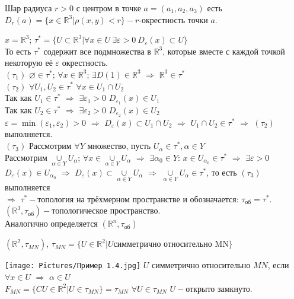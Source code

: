 \documentclass[11pt,fleqn]{book} %
\begin{document}
\begin{definition}[Шар]
Шар радиуса $r>0$ с центром в точке $a=(a_1,a_2,a_3)$ есть $D_r(a)=\{x{\in}\mathbb{R}^3|\rho(x,y)<r\}-r$-окрестность точки $a$.
\end{definition}

\begin{example}
$x=\mathbb{R}^3$; $\tau^*=\{U{\subset}\mathbb{R}^3|\forall x{\in}U \ \exists \varepsilon>0 \ D_{\varepsilon}(x){\subset}U\}$\\
То есть $\tau^*$ содержит все подмножества в $\mathbb{R}^3$, которые вместе с каждой точкой некоторую её $\varepsilon$ окрестность.\\
$(\tau_1)$ $\varnothing{\in}\tau^*$; $\forall x{\in}\mathbb{R}^3$; $\exists D(1){\in}\mathbb{R}^3$ $\Rightarrow$ $\mathbb{R}^3{\in}\tau^*$\\
$(\tau_2)$ $\forall U_1,U_2{\in}\tau^*$ $\forall x{\in}U_1{\cap}U_2$\\
Так как $U_1{\in}\tau^*$ $\Rightarrow$ $\exists \varepsilon_1>0$ $D_{\varepsilon_1}(x){\in}U_1$\\
Так как $U_2{\in}\tau^*$ $\Rightarrow$ $\exists \varepsilon_2>0$ $D_{\varepsilon_2}(x){\in}U_2$\\
$\varepsilon=\min(\varepsilon_1,\varepsilon_2)>0$ $\Rightarrow$ $D_{\varepsilon}(x){\subset}U_1{\cap}U_2$ $\Rightarrow$ $U_1{\cap}U_2{\in}\tau^*$ $\Rightarrow$ $(\tau_2)$ выполняется.\\
$(\tau_3)$ Рассмотрим $\forall Y$ множество, пусть $U_{\alpha}{\in}\tau^*, \alpha{\in}Y$\\
Рассмотрим $\underset{\alpha{\in}Y}{\cup}U_{\alpha}$; $\forall x{\in}\underset{\alpha{\in}Y}{\cup}U_{\alpha}$ $\Rightarrow$ $\exists \alpha_0{\in}Y$: $x{\in}U_{\alpha_0}{\in}\tau^*$ $\Rightarrow$ $\exists\varepsilon>0$ $D_{\varepsilon}(x){\in}U_{\alpha_0}$ $\Rightarrow$ $D_{\varepsilon}(x){\subset}\underset{\alpha{\in}Y}{\cup}U_{\alpha}$ $\Rightarrow$ $\underset{\alpha{\in}Y}{\cup}U_{\alpha}{\in}\tau^*$, то есть $(\tau_3)$ выполняется\\
$\Rightarrow$ $\tau^*-$топология на трёхмерном пространстве и обозначается: $\tau_{\text{об}}=\tau^*$. $(\mathbb{R}^3,\tau_{\text{об}})-$топологическое пространство.\\
Аналогично определяется $(\mathbb{R}^n,\tau_{\text{об}})$
\end{example}

\begin{example}
$(\mathbb{R^2},\tau_{MN})$, $\tau_{MN}=\{U{\in}\mathbb{R}^2|U\text{симметрично относительно MN}\}$

\texttt{[image: Pictures/Пример 1.4.jpg]}
$U$ симметрично относительно $MN$, если $\forall x{\in}U$ $\Rightarrow$ $\alpha{\in}U$\\
$F_{MN}=\{CU{\in}\mathbb{R}^2|U{\in}\tau_{MN}\}=\tau_{MN}$
$\forall U{\in}\tau_{MN}$ $U-$открыто замкнуто.
\end{example}
\end{document}
